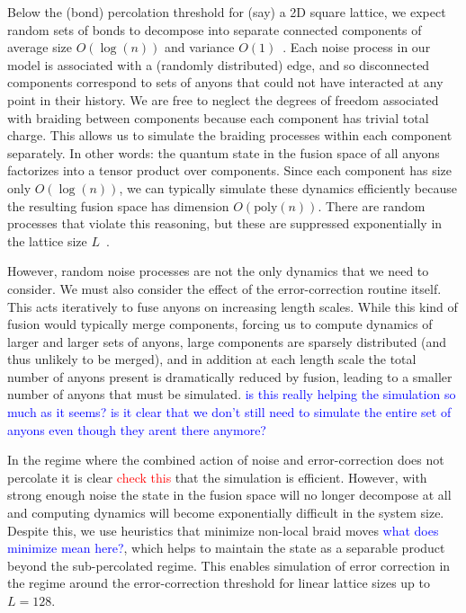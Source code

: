 \documentclass[aps, prl, letterpaper, twocolumn, superscriptaddress, notitlepage, 10pt]{revtex4}
\newcommand{\cggb}[1]{\textcolor{blue}{#1}}
\newcommand{\dude}[1]{\textcolor{red}{#1}}
\begin{document}
Below the (bond) percolation threshold for (say) a 2D square lattice, we expect random sets of 
bonds to decompose into separate connected components 
of average size $O(\log(n))$ and variance $O(1)$~\cite{Bazant2000}.
Each noise process in our model is associated with a (randomly distributed) edge, and so 
disconnected components correspond to sets of anyons that could not have interacted at any 
point in their history. 
We are free to neglect the degrees of freedom associated with braiding between components 
because each component has trivial total charge.
This allows us to simulate the braiding processes within each component separately. 
In other words: the quantum state in the fusion space of all anyons factorizes into 
a tensor product over components. 
Since each 
component has size only $O(\log(n))$, we can typically simulate these dynamics efficiently 
because the resulting fusion space has dimension $O(\mathrm{poly}(n))$. 
There are 
random processes that violate this reasoning, but these are suppressed 
exponentially in the lattice size $L$~\cite{Grimmett1989}. 

However, random noise processes are not the only dynamics that we need to consider. We 
must also consider the effect of the error-correction routine itself. This acts iteratively to fuse 
anyons on increasing length scales. While this kind of fusion would typically merge components, 
forcing us to compute dynamics of larger and larger sets of anyons,
large components are sparsely distributed
(and thus unlikely to be merged), and in addition at each length scale the total number of 
anyons present is dramatically reduced by fusion, leading to a smaller number of anyons that 
must be simulated. \cggb{is this really helping the simulation so much as it seems? is it clear that we don't still need to simulate the entire set of anyons even though they arent there anymore?}

In the regime where the combined action of noise and error-correction does not percolate
it is clear \dude{check this} that the simulation is efficient.
However, with strong enough noise the state in the fusion space will
no longer decompose at all and computing dynamics will
become exponentially difficult in the system size.
Despite this, we use heuristics %
that minimize non-local braid moves \cggb{what does minimize mean here?}, which helps to
maintain the state as a separable product beyond the
sub-percolated regime.
This enables simulation of error correction in
the regime around the error-correction threshold for linear lattice sizes up to $L=128$.
\end{document}
